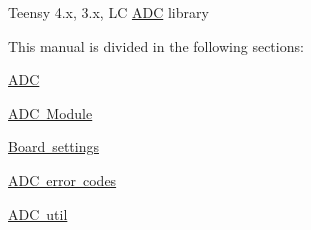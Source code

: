 Teensy 4.\+x, 3.\+x, LC \mbox{\hyperlink{class_a_d_c}{A\+DC}} library

This manual is divided in the following sections\+:
\begin{DoxyItemize}
\item \mbox{\hyperlink{adc_doc}{A\+DC}}
\item \mbox{\hyperlink{adc_module}{A\+DC Module}}
\item \mbox{\hyperlink{settings}{Board settings}}
\item \mbox{\hyperlink{error}{A\+DC error codes}}
\item \mbox{\hyperlink{util}{A\+DC util}} 
\end{DoxyItemize}